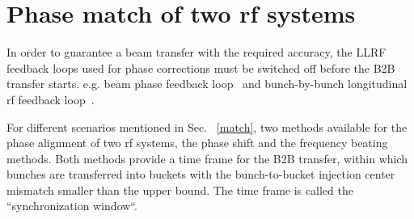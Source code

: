 \section{Phase match of two rf systems}
\label{two_sync_methods}
In order to guarantee a beam transfer with the required accuracy, the LLRF feedback loops used for phase corrections must be switched off before the B2B transfer starts. e.g. beam phase feedback loop~\cite{grieser_beam_2015} and bunch-by-bunch longitudinal rf feedback loop~\cite{gross_bunch-by-bunch_2015}.



For different scenarios mentioned in Sec. ~\ref{match}, two methods available for the phase alignment of two rf systems, the phase shift and the frequency beating methods. Both methods provide a time frame for the B2B transfer, within which bunches are transferred into buckets with the bunch-to-bucket injection center mismatch smaller than the upper bound. The time frame is called the ``synchronization window``. 

